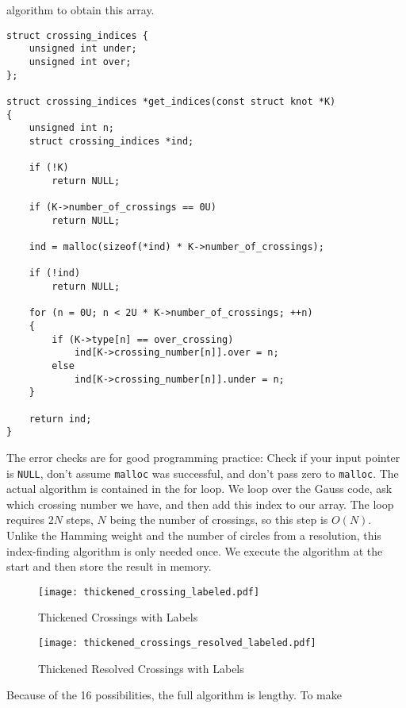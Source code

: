         algorithm to obtain this array.
\begin{lstlisting}[style=CStyle]
struct crossing_indices {
    unsigned int under;
    unsigned int over;
};

struct crossing_indices *get_indices(const struct knot *K)
{
    unsigned int n;
    struct crossing_indices *ind;

    if (!K)
        return NULL;

    if (K->number_of_crossings == 0U)
        return NULL;

    ind = malloc(sizeof(*ind) * K->number_of_crossings);

    if (!ind)
        return NULL;

    for (n = 0U; n < 2U * K->number_of_crossings; ++n)
    {
        if (K->type[n] == over_crossing)
            ind[K->crossing_number[n]].over = n;
        else
            ind[K->crossing_number[n]].under = n;
    }

    return ind;
}
\end{lstlisting}
        The error checks are for good programming practice: Check if your
        input pointer is \texttt{NULL}, don't assume \texttt{malloc} was
        successful, and don't pass zero to \texttt{malloc}. The actual algorithm
        is contained in the for loop. We loop over the Gauss code, ask which
        crossing number we have, and then add this index to our array. The
        loop requires $2N$ steps, $N$ being the number of crossings, so this
        step is $O(N)$. Unlike the Hamming weight and the number of circles
        from a resolution, this index-finding algorithm is only needed once. We
        execute the algorithm at the start and then store the result in
        memory.
        \begin{figure}
            \centering
            \texttt{[image: thickened\_crossing\_labeled.pdf]}
            \caption{Thickened Crossings with Labels}
            \label{fig:thickened_crossings_labeled}
        \end{figure}
        \begin{figure}
            \centering
            \texttt{[image: thickened\_crossings\_resolved\_labeled.pdf]}
            \caption{Thickened Resolved Crossings with Labels}
            \label{fig:thickened_crossings_resolved_labeled}
        \end{figure}
        \par\hfill\par
        Because of the 16 possibilities, the full algorithm is lengthy. To make
